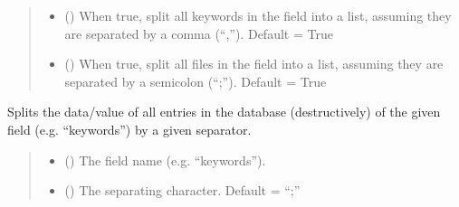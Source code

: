 \documentclass[letterpaper,10pt,english]{sphinxmanual}
\begin{document}
\begin{fulllineitems}
\begin{fulllineitems}
\begin{quote}
\begin{description}
\begin{itemize}
\item {} 
\sphinxAtStartPar
{} () \textendash{} When true, split all keywords in the 
field into a list, assuming they are separated by a comma (“,”).
Default = True

\item {} 
\sphinxAtStartPar
{} () \textendash{} When true, split all files in the  field into
a list, assuming they are separated by a semicolon (“;”).
Default = True

\end{itemize}

\end{description}\end{quote}

\end{fulllineitems}


\begin{fulllineitems}
\label{\detokenize{generated/bp_text.database:bp_text.database.BibTexDatabase.split_fields_by}}
\pysigstartsignatures
\pysiglinewithargsret
{}
{\sphinxparamcomma {}}
{}
\pysigstopsignatures
\sphinxAtStartPar
Splits the data/value of all entries in the database (destructively)
of the given field (e.g. “keywords”) by a given separator.
\begin{quote}\begin{description}
\begin{itemize}
\item {} 
\sphinxAtStartPar
{} () \textendash{} The field name (e.g. “keywords”).

\item {} 
\sphinxAtStartPar
{} () \textendash{} The separating character. Default = “;”

\end{itemize}

\end{description}\end{quote}

\end{fulllineitems}


\end{fulllineitems}
\end{document}
